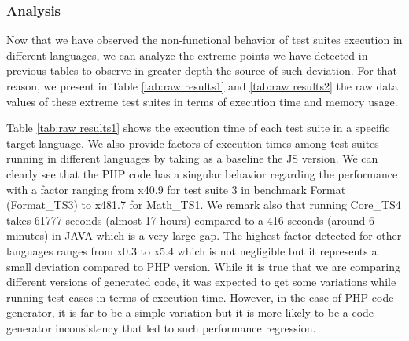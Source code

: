 \subsubsection{Analysis}
Now that we have observed the non-functional behavior of test suites execution in different languages, we can analyze the extreme points we have detected in previous tables to observe in greater depth the source of such deviation.
For that reason, we present in Table \ref{tab:raw results1} and \ref{tab:raw results2} the raw data values of these extreme test suites in terms of execution time and memory usage. 

Table \ref{tab:raw results1} shows the execution time of each test suite in a specific target language. We also provide factors of execution times among test suites running in different languages by taking as a baseline the JS version. 
We can clearly see that the PHP code has a singular behavior regarding the performance with a factor ranging from x40.9 for test suite 3 in benchmark Format (Format\_TS3) to x481.7 for Math\_TS1. We remark also that running Core\_TS4 takes 61777 seconds (almost 17 hours) compared to a 416 seconds (around 6 minutes) in JAVA which is a very large gap. The highest factor detected for other languages ranges from x0.3 to x5.4 which is not negligible but it represents a small deviation compared to PHP version. While it is true that we are comparing different versions of generated code, it was expected to get some variations while running test cases in terms of execution time. However, in the case of PHP code generator, it is far to be a simple variation but it is more likely to be a code generator inconsistency that led to such performance regression.


